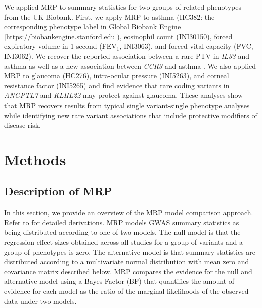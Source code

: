 We applied MRP to summary statistics for two groups of related phenotypes from the UK Biobank. First, we apply MRP to asthma (HC382: the corresponding phenotype label in Global Biobank Engine [\url{https://biobankengine.stanford.edu}]), eosinophil count (INI30150), forced expiratory volume in 1-second (FEV$_1$, INI3063), and forced vital capacity (FVC, INI3062). We recover the reported association between a rare PTV in \textit{IL33} and asthma as well as a new association between \textit{CCR3} and asthma \cite{DeBoever179762, 10.1371/journal.pgen.1006659}. We also applied MRP to glaucoma (HC276), intra-ocular pressure (INI5263), and corneal resistance factor (INI5265) and find evidence that rare coding variants in \textit{ANGPTL7} and \textit{KLHL22} may protect against glaucoma. These analyses show that MRP recovers results from typical single variant-single phenotype analyses while identifying new rare variant associations that include protective modifiers of disease risk.

\section*{Methods}

\subsection*{Description of MRP}
In this section, we provide an overview of the MRP model comparison approach. Refer to  for detailed derivations. MRP models GWAS summary statistics as being distributed according to one of two models. The null model is that the regression effect sizes obtained across all studies for a group of variants and a group of phenotypes is zero. The alternative model is that summary statistics are distributed according to a multivariate normal distribution with mean zero and covariance matrix described below. MRP compares the evidence for the null and alternative model using a Bayes Factor (BF) that quantifies the amount of evidence for each model as the ratio of the marginal likelihoods of the observed data under two models. 

